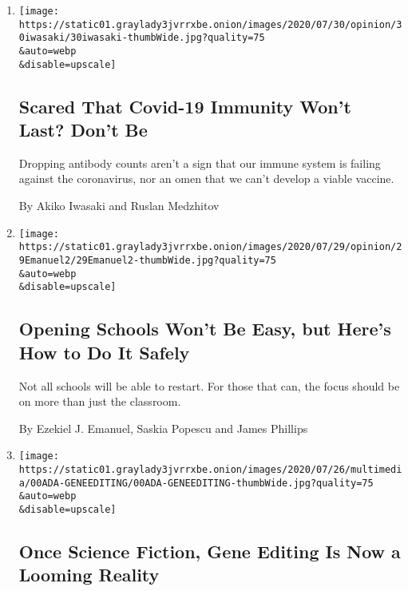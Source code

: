 \begin{enumerate}
\def\labelenumi{\arabic{enumi}.}
\item
  \href{/2020/07/31/opinion/coronavirus-antibodies-immunity.html}{}

  \texttt{[image: https://static01.graylady3jvrrxbe.onion/images/2020/07/30/opinion/30iwasaki/30iwasaki-thumbWide.jpg?quality=75\\\&auto=webp\\\&disable=upscale]}

  \hypertarget{scared-that-covid-19-immunity-wont-last-dont-be}{%
  \subsection{Scared That Covid-19 Immunity Won't Last? Don't
  Be}\label{scared-that-covid-19-immunity-wont-last-dont-be}}

  Dropping antibody counts aren't a sign that our immune system is
  failing against the coronavirus, nor an omen that we can't develop a
  viable vaccine.

  By Akiko Iwasaki and Ruslan Medzhitov
\item
  \href{/2020/07/29/opinion/coronavirus-schools-reopen.html}{}

  \texttt{[image: https://static01.graylady3jvrrxbe.onion/images/2020/07/29/opinion/29Emanuel2/29Emanuel2-thumbWide.jpg?quality=75\\\&auto=webp\\\&disable=upscale]}

  \hypertarget{opening-schools-wont-be-easy-but-heres-how-to-do-it-safely}{%
  \subsection{Opening Schools Won't Be Easy, but Here's How to Do It
  Safely}\label{opening-schools-wont-be-easy-but-heres-how-to-do-it-safely}}

  Not all schools will be able to restart. For those that can, the focus
  should be on more than just the classroom.

  By Ezekiel J. Emanuel, Saskia Popescu and James Phillips
\item
  \href{/2020/07/22/style/crispr-gene-editing-ethics.html}{}

  \texttt{[image: https://static01.graylady3jvrrxbe.onion/images/2020/07/26/multimedia/00ADA-GENEEDITING/00ADA-GENEEDITING-thumbWide.jpg?quality=75\\\&auto=webp\\\&disable=upscale]}

  \hypertarget{once-science-fiction-gene-editing-is-now-a-looming-reality}{%
  \subsection{Once Science Fiction, Gene Editing Is Now a Looming
  Reality}\label{once-science-fiction-gene-editing-is-now-a-looming-reality}}


\end{enumerate}
